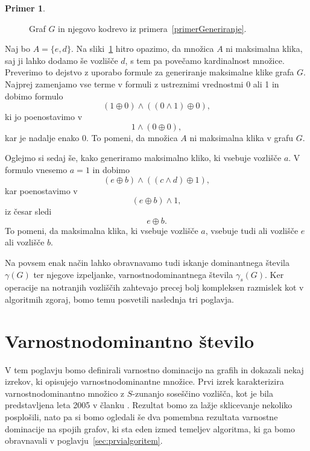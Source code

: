 \documentclass[12pt,a4paper,twoside]{article}
\theoremstyle{definition} %
\newtheorem{primer}[definicija]{Primer}
\theoremstyle{plain} %
\numberwithin{equation}{section}  %
\begin{document}
\begin{enumerate}[label=($\roman*$)]
\begin{primer}
\begin{figure}[h!]
\caption{Graf $G$ in njegovo kodrevo iz primera~\ref{primerGeneriranje}.}
\label{fig:primerGeneriranjaFormule}
\end{figure}

Naj bo  $A = \{e, d\}$. Na sliki~\ref{fig:primerGeneriranjaFormule} hitro opazimo, da množica $A$ ni maksimalna klika, saj ji lahko dodamo še vozlišče $d$, s tem pa povečamo kardinalnost množice. Preverimo to dejstvo z uporabo formule za generiranje maksimalne klike grafa $G$. Najprej zamenjamo vse terme v formuli z ustreznimi vrednostmi 0 ali 1 in dobimo formulo
$$(1 \oplus 0) \land ((0 \land 1) \oplus 0),$$ ki jo poenostavimo v $$1 \land (0 \oplus 0),$$ kar je nadalje enako 0. To pomeni, da množica $A$ ni maksimalna klika v grafu $G$.

Oglejmo si sedaj še, kako generiramo maksimalno kliko, ki vsebuje vozlišče $a$. V formulo vnesemo $a=1$ in dobimo $$(e \oplus b) \land ((c \land d) \oplus 1),$$ kar poenostavimo v $$(e \oplus b) \land 1,$$ iz česar sledi $$e \oplus b.$$
To pomeni, da maksimalna klika, ki vsebuje vozlišče $a$, vsebuje tudi ali vozlišče $e$ ali vozlišče $b$.
\end{primer}
\end{enumerate}

Na povsem enak način lahko obravnavamo tudi iskanje dominantnega števila $\gamma(G)$ ter njegove izpeljanke, varnostnodominantnega števila $\gamma_s(G)$. Ker operacije na notranjih vozliščih zahtevajo precej bolj kompleksen razmislek kot v algoritmih zgoraj, bomo temu posvetili naslednja tri poglavja.


\section{Varnostnodominantno število}\label{sec:varnostnadominacija}
V tem poglavju bomo definirali varnostno dominacijo na grafih in dokazali nekaj izrekov, ki opisujejo varnostnodominantne množice. Prvi izrek karakterizira varnostnodominantno množico z $S$-zunanjo soseščino vozlišča, kot je bila predstavljena leta 2005 v članku \cite{cockayne2005protection}. Rezultat bomo za lažje sklicevanje nekoliko posplošili, nato pa si bomo ogledali še dva pomembna rezultata varnostne dominacije na spojih grafov, ki sta eden izmed temeljev algoritma, ki ga bomo obravnavali v poglavju~\ref{sec:prvialgoritem}.
\end{document}
